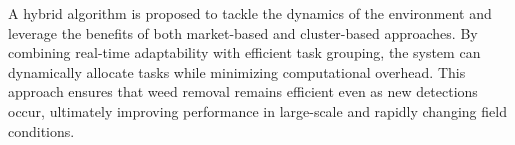 A hybrid algorithm is proposed to tackle the dynamics of the environment and leverage the benefits of both market-based and cluster-based approaches. By combining real-time adaptability with efficient task grouping, the system can dynamically allocate tasks while minimizing computational overhead. This approach ensures that weed removal remains efficient even as new detections occur, ultimately improving performance in large-scale and rapidly changing field conditions.